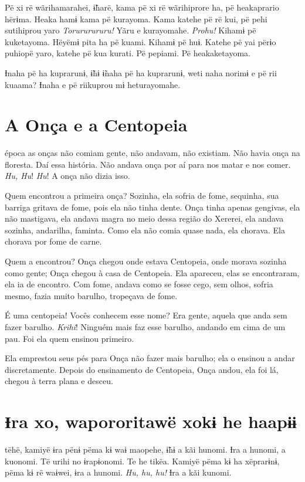 Pë xi rë wãrihamarahei, ɨ̃harë, kama pë xi rë wãrihiprore ha, pë
heakaprario hërɨma. Heaka hamɨ kama pë kurayoma. Kama katehe pë rë kui,
pë pehi sutihiprou yaro \textit{Torururururu!} Yãru e kurayomahe. \textit{Prohu!} Kihamɨ
pë kuketayoma. Hëyëmɨ pita ha pë kuami. Kihamɨ pë huɨ. Katehe pë yai
përɨo puhiopë yaro, katehe pë kua kurati. Pë pepiami. Pë heakaketayoma. 

Ɨnaha pë ha kuprarunɨ, ɨ̃hɨ ɨ̃naha pë ha kuprarunɨ, weti naha norimɨ e pë
rii kuaama? Ɨnaha e pë riikuprou mɨ heturayomahe. 

 
\chapter{A Onça e a Centopeia}
 
 época as onças não comiam gente, não andavam, não existiam. Não
havia onça na floresta. Daí essa história. Não andava onça por aí para nos
matar e nos comer. \textit{Hu, Hu}! \textit{Hu}! A onça não dizia isso. 

Quem encontrou a primeira onça? Sozinha, ela sofria de fome, sequinha,
sua barriga gritava de fome, pois ela não tinha dente. Onça tinha apenas
gengivas, ela não mastigava, ela andava magra no meio dessa região do
Xererei, ela andava sozinha, andarilha, faminta. Como ela não comia quase
nada, ela chorava. Ela chorava por fome de carne. 

Quem a encontrou? Onça chegou onde estava Centopeia, onde morava
sozinha como gente; Onça chegou à casa de Centopeia. Ela apareceu, elas
se encontraram, ela ia de encontro. Com fome, andava como se fosse cego,
sem olhos, sofria mesmo, fazia muito barulho, tropeçava de fome. 

É uma centopeia! Vocês conhecem esse nome? Era gente, aquela que anda
 sem fazer barulho. \textit{Krihi}! Ninguém mais faz esse barulho, andando em cima de um pau.
 Foi ela quem ensinou primeiro.

Ela emprestou seus pés para Onça não fazer mais barulho; ela o ensinou a
andar discretamente. Depois do ensinamento de Centopeia, Onça andou, ela
foi lá, chegou à terra plana e desceu.

\chapter[Ɨra xo, wapororitawë xo kɨ he haapɨɨ]{Ɨra xo, wapororitawë xo\break kɨ he haapɨɨ}

 tëhë, kamiyë ɨra pënɨ pëma kɨ waɨ maopehe, ɨ̃hɨ a kãi hunomi. Ɨra a
hunomi, a kuonomi. Të urihi no ɨrapɨonomi. Te he tikëa. Kamiyë pëma kɨ
ha xëprarɨnɨ, pëma kɨ rë waɨwei, ɨra a hunomi. \textit{Hu, hu, hu!} Ɨra a kãi
kunomi. 

